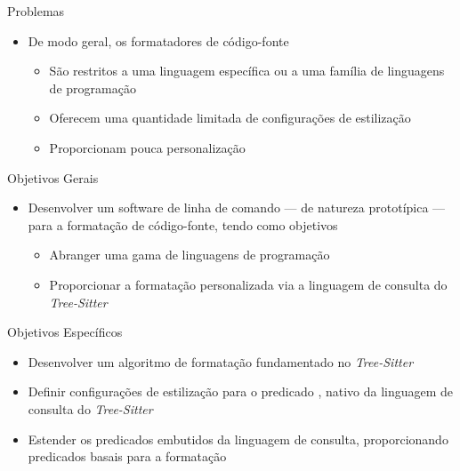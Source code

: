 \documentclass
  [ aspectratio=169,
    english,
    hyperref={citecolor=blue,colorlinks=true,linkcolor=blue,urlcolor=blue},
    brazil]
  {beamer}
\newcommand{\treesitter}{\textit{Tree-Sitter}\xspace}
\begin{document}

  \begin{frame}{Problemas}
    \begin{itemize}
      \item De modo geral, os formatadores de código-fonte
            \begin{itemize}
              \item São restritos a uma linguagem específica ou a uma família
                    de linguagens de programação
              \item Oferecem uma quantidade limitada de configurações de
                    estilização
              \item Proporcionam pouca personalização
            \end{itemize}
    \end{itemize}
  \end{frame}


  \begin{frame}{Objetivos Gerais}
    \begin{itemize}
      \item Desenvolver um software de linha de comando --- de natureza
            prototípica --- para a formatação de código-fonte, tendo como
            objetivos
            \begin{itemize}
              \item Abranger uma gama de linguagens de programação
              \item Proporcionar a formatação personalizada via a linguagem de
                    consulta do \treesitter
            \end{itemize}
    \end{itemize}
  \end{frame}


  \begin{frame}[fragile]{Objetivos Específicos}
    \begin{itemize}
      \item Desenvolver um algoritmo de formatação fundamentado no \treesitter
      \item Definir configurações de estilização para o predicado
            , nativo da linguagem de consulta do
            \treesitter
      \item Estender os predicados embutidos da linguagem de consulta,
            proporcionando predicados basais para a formatação
    \end{itemize}
  \end{frame}
\end{document}
